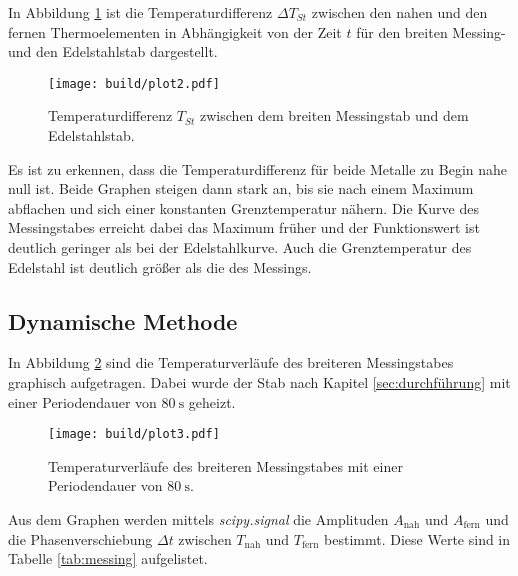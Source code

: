 \noindent
In Abbildung \ref{fig:diff} ist die Temperaturdifferenz $\Delta T_{St}$ zwischen den nahen und den fernen Thermoelementen in Abhängigkeit 
von der Zeit $t$ für den breiten Messing- und den Edelstahlstab dargestellt. 

\begin{figure}[H]
    \centering
    \texttt{[image: build/plot2.pdf]}
    \caption{Temperaturdifferenz $T_{St}$ zwischen dem breiten Messingstab und dem Edelstahlstab.}
    \label{fig:diff}
\end{figure}

\noindent
Es ist zu erkennen, dass die Temperaturdifferenz für beide Metalle zu Begin nahe null ist. Beide Graphen steigen dann stark an, bis sie 
nach einem Maximum abflachen und sich einer konstanten Grenztemperatur nähern. Die Kurve des Messingstabes erreicht dabei das Maximum früher 
und der Funktionswert ist deutlich geringer als bei der Edelstahlkurve. Auch die Grenztemperatur des Edelstahl ist deutlich größer als die des
Messings. 

\subsection{Dynamische Methode}
\label{sec:ad}
In Abbildung \ref{fig:messing} sind die Temperaturverläufe des breiteren Messingstabes graphisch aufgetragen. Dabei wurde der Stab nach Kapitel
\ref{sec:durchführung} mit einer Periodendauer von $\SI{80}{\second}$ geheizt.

\begin{figure}[H]
    \centering
    \texttt{[image: build/plot3.pdf]}
    \caption{Temperaturverläufe des breiteren Messingstabes mit einer Periodendauer von $\SI{80}{\second}$.}
    \label{fig:messing}
\end{figure}
\noindent

Aus dem Graphen werden mittels \textit{scipy.signal} \cite{scipy} die Amplituden $A_\text{nah}$ und $A_\text{fern}$ und die Phasenverschiebung $\Delta t$ zwischen 
$T_\text{nah}$ und $T_\text{fern}$ bestimmt. Diese Werte sind in Tabelle \ref{tab:messing}  aufgelistet. 

